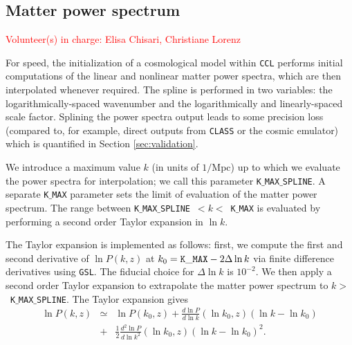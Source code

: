 \documentclass[\docopts]{\docclass}
\newcommand{\vol}[1]{\textcolor{red}{Volunteer(s) in charge: #1}}
\newcommand{\cont}[1]{\textcolor{blue}{Suggested content: #1}}
\begin{document}

\subsection{Matter power spectrum}
\vol{Elisa Chisari, Christiane Lorenz}

For speed, the initialization of a cosmological model within {\tt CCL} performs initial computations of the linear and nonlinear matter power spectra, which are then interpolated whenever required. The spline is performed in two variables: the logarithmically-spaced wavenumber and the logarithmically and linearly-spaced scale factor. Splining the power spectra output leads to some precision loss (compared to, for example, direct outputs from {\tt CLASS} or the cosmic emulator) which is quantified in Section \ref{sec:validation}.

We introduce a maximum value $k$ (in units of $1/$Mpc) up to which we evaluate the power spectra for interpolation; we call this parameter {\tt K$\_$MAX$\_$SPLINE}. A separate {\tt K$\_$MAX} parameter sets the limit of evaluation of the matter power spectrum. The range between {\tt K$\_$MAX$\_$SPLINE}~$<k<$~{\tt K$\_$MAX} is evaluated by performing a second order Taylor expansion in $\ln k$.

The Taylor expansion is implemented as follows: first, we compute the first and second derivative of $\ln P(k,z)$ at $k_0={\rm \tt K\_MAX}-2\Delta\ln k$ via finite difference derivatives using {\tt GSL}. The fiducial choice for $\Delta\ln k$ is $10^{-2}$. We then apply a second order Taylor expansion to extrapolate the matter power spectrum to $k>$~{\tt K$\_$MAX$\_$SPLINE}. The Taylor expansion gives
%
\begin{eqnarray}
  \ln P(k,z) &\simeq& \ln P(k_0,z) + \frac{d\ln P}{d\ln k}(\ln k_0,z) (\ln k-\ln k_0)  \nonumber\\
  &+& \frac{1}{2}  \frac{d^2\ln P}{d\ln k^2}(\ln k_0,z) (\ln k-\ln k_0)^2.
  \label{eq:NLPSTaylor}
\end{eqnarray}
\end{document}
